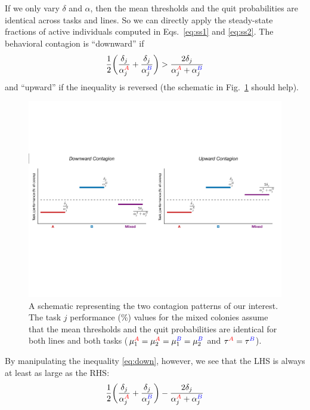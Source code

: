\documentclass[11pt]{article}
\newcommand{\A}{{\color{red}A}}
\newcommand{\B}{{\color{blue}B}}
\begin{document}
\begin{appendices}
If we only vary $\delta$ and $\alpha$, then the mean thresholds and the quit probabilities are identical across tasks and lines. So we can directly apply the steady-state fractions of active individuals computed in Eqs.~\eqref{eq:ss1} and \eqref{eq:ss2}. The behavioral contagion is ``downward'' if
\begin{equation}
    \frac{1}{2} \bigg( \frac{\delta_j}{\alpha_j^{\A}} + \frac{\delta_j}{\alpha_j^{\B}} \bigg) > \frac{2\delta_j}{\alpha_j^{\A} + \alpha_j^{\B}} \label{eq:down}
\end{equation}
and ``upward'' if the inequality is reversed (the schematic in Fig.~\ref{fig:schematic} should help).
\begin{figure}[H]
    \centering
    \includegraphics[width=0.9\linewidth]{./schematic_contagion.pdf}
    \caption{A schematic representing the two contagion patterns of our interest. The task $j$ performance (\%) values for the mixed colonies assume that the mean thresholds and the quit probabilities are identical for both lines and both tasks ($\mu_1^{\A} = \mu_2^{\A} = \mu_1^{\B} = \mu_2^{\B}$ and $\tau^{\A} = \tau^{\B}$).}
    \label{fig:schematic}
\end{figure}
\noindent By manipulating the inequality \eqref{eq:down}, however, we see that the LHS is always at least as large as the RHS:
\begin{align}
    \frac{1}{2} \bigg( \frac{\delta_j}{\alpha_j^{\A}} + \frac{\delta_j}{\alpha_j^{\B}} \bigg) - \frac{2\delta_j}{\alpha_j^{\A} + \alpha_j^{\B}} 

\end{align}
\end{appendices}
\end{document}
